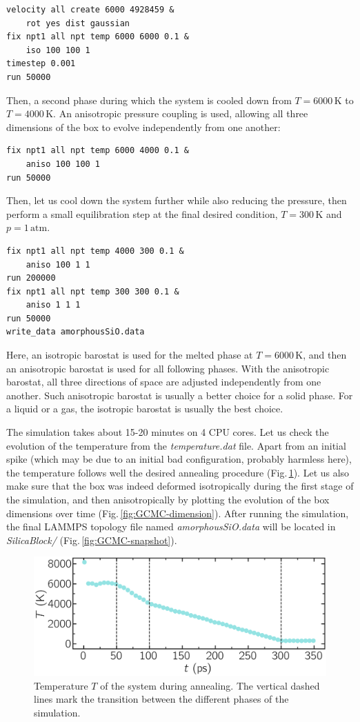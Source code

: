 \documentclass[9pt,tutorial]{livecoms}
\begin{document}
{\normalsize \begin{verbatim}
velocity all create 6000 4928459 &
    rot yes dist gaussian
fix npt1 all npt temp 6000 6000 0.1 &
    iso 100 100 1
timestep 0.001
run 50000
\end{verbatim}}
Then, a second phase during which the system is cooled down from $T = 6000\,\text{K}$ to $T = 4000\,\text{K}$. An anisotropic pressure coupling is used, allowing all three dimensions of the box to evolve independently from one another:
{\normalsize \begin{verbatim}
fix npt1 all npt temp 6000 4000 0.1 &
    aniso 100 100 1
run 50000
\end{verbatim}}
Then, let us cool down the system further while also reducing the pressure, then perform a small equilibration step at the final desired condition, $T = 300\,\text{K}$ and $p = 1\,\text{atm}$.
{\normalsize \begin{verbatim}
fix npt1 all npt temp 4000 300 0.1 &
    aniso 100 1 1
run 200000
fix npt1 all npt temp 300 300 0.1 &
    aniso 1 1 1
run 50000
write_data amorphousSiO.data
\end{verbatim}}
Here, an isotropic barostat is used for the melted phase at $T = 6000\,\text{K}$, and then an anisotropic barostat is used for all following phases. With the anisotropic barostat, all three directions of space are adjusted independently from one another. Such anisotropic barostat is usually a better choice for a solid phase. For a liquid or a gas, the isotropic barostat is usually the best choice.

The simulation takes about 15-20 minutes on 4 CPU cores. Let us check the evolution of the temperature from the \textit{temperature.dat} file. Apart from an initial spike (which may be due to an initial bad configuration, probably harmless here),
the temperature follows well the desired annealing procedure  (Fig.\,\ref{fig:GCMC-temperature}). Let us also make sure that the box was indeed deformed isotropically during the first stage of the simulation, and then anisotropically by plotting the evolution of the box dimensions over time (Fig.\,\ref{fig:GCMC-dimension}). After running the simulation, the final LAMMPS topology file named \textit{amorphousSiO.data} will be located in \textit{SilicaBlock/} (Fig.\,\ref{fig:GCMC-snapshot}).

\begin{figure}
\centering
\includegraphics[width=\linewidth]{GCMC-temperature}
\caption{Temperature $T$ of the system during annealing. The vertical dashed lines mark the transition between the different phases of the simulation.}
\label{fig:GCMC-temperature}
\end{figure}
\end{document}
